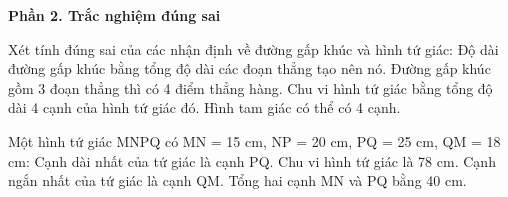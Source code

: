 \textbf{Phần 2. Trắc nghiệm đúng sai}

\begin{ex} %
Xét tính đúng sai của các nhận định về đường gấp khúc và hình tứ giác:
\choiceTF
{\True Độ dài đường gấp khúc bằng tổng độ dài các đoạn thẳng tạo nên nó.}
{Đường gấp khúc gồm 3 đoạn thẳng thì có 4 điểm thẳng hàng.}
{\True Chu vi hình tứ giác bằng tổng độ dài 4 cạnh của hình tứ giác đó.}
{Hình tam giác có thể có 4 cạnh.}
\end{ex}

\begin{ex} %
Một hình tứ giác MNPQ có MN = 15 cm, NP = 20 cm, PQ = 25 cm, QM = 18 cm:
\choiceTF
{\True Cạnh dài nhất của tứ giác là cạnh PQ.}
{\True Chu vi hình tứ giác là 78 cm.}
{Cạnh ngắn nhất của tứ giác là cạnh QM.}
{\True Tổng hai cạnh MN và PQ bằng 40 cm.}
\end{ex}


